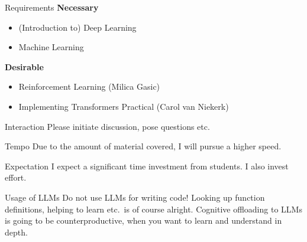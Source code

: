 \begin{frame}{Requirements}
      \textbf{Necessary}
      \begin{itemize}
        \item (Introduction to) Deep Learning
        \item Machine Learning
      \end{itemize}

      \vspace{0.8em}
      \textbf{Desirable}
      \begin{itemize}
          \item Reinforcement Learning (Milica Gasic)
          \item Implementing Transformers Practical (Carol van Niekerk)
      \end{itemize}

  \vspace{1em}
  \begin{alertblock}{Interaction}
    Please initiate discussion, pose questions etc.
  \end{alertblock}

  \vspace{1em}
  \begin{alertblock}{Tempo}
    Due to the amount of material covered, I will pursue a higher speed.
  \end{alertblock}

  \vspace{1em}
  \begin{alertblock}{Expectation}
    I expect a significant time investment from students. I also invest effort.
  \end{alertblock}

  \vspace{1em}
  \begin{alertblock}{Usage of LLMs}
	  Do not use LLMs for writing code! Looking up function definitions, helping to learn etc.\ is of course alright.
	  Cognitive offloading to LLMs is going to be counterproductive, when you want to learn and understand in depth.
  \end{alertblock}
\end{frame}

